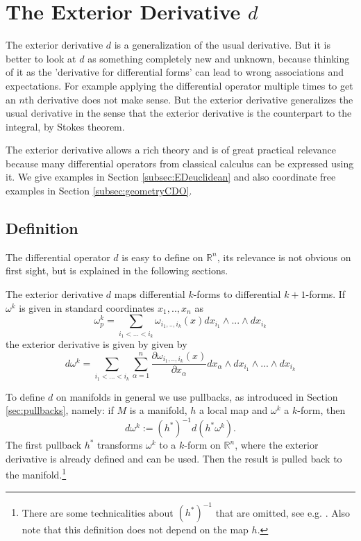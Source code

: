 \section{The Exterior Derivative $d$}
\label{sec:EC_exteriorDerivative}
The exterior derivative $d$ is a generalization of the usual derivative. But it is better to look at $d$ as something completely new and unknown, because thinking of it as the 'derivative for differential forms' can lead to wrong associations and expectations. For example applying the differential operator multiple times to get an $n$th derivative does not make sense. But the exterior derivative generalizes the usual derivative in the sense that the exterior derivative is the counterpart to the integral, by Stokes theorem.

The exterior derivative allows a rich theory and is of great practical relevance because  many differential operators from classical calculus can be expressed using it. We give examples in Section \ref{subsec:EDeuclidean} and also coordinate free examples in Section \ref{subsec:geometryCDO}.

\subsection{Definition} 
The differential operator $d$ is easy to define on $\mathbb R^n$, its relevance is not obvious on first sight, but is explained in the following sections.
\begin{definition}
The exterior derivative $d$ maps differential $k$-forms to differential $k+1$-forms. If $\omega^k$ is given in standard coordinates $x_1,..,x_n$ as 
\[\omega^k_p= \sum_{i_1<...<i_k} \omega_{i_1,..,i_k}(x) dx_{i_1} \wedge ... \wedge dx_{i_k}\]
the exterior derivative is given by
given by 
\[d\omega^k = \sum_{i_1<...<i_k}\sum_{\alpha = 1}^{n}\frac{\partial \omega_{i_1,..,i_k}(x)}{\partial x_\alpha} dx_{\alpha} \wedge dx_{i_1} \wedge ... \wedge dx_{i_k}\]
\end{definition}

To define $d$ on manifolds in general we use pullbacks, as introduced in Section \ref{sec:pullbacks}, namely: if $M$ is a manifold, $h$ a local map and $\omega^k$ a $k$-form, then
\[d\omega^k := (h^*)^{-1}d(h^*\omega^k).\]
The first pullback $h^*$ transforms $\omega^k$ to a $k$-form on $\mathbb R^n$, where the exterior derivative is already defined and can be used. Then the result is pulled back to the manifold.\footnote{There are some technicalities about $(h^*)^{-1}$ that are omitted, see e.g. \cite{globalAnalysis}. Also note that this definition does not depend on the map $h$.}


